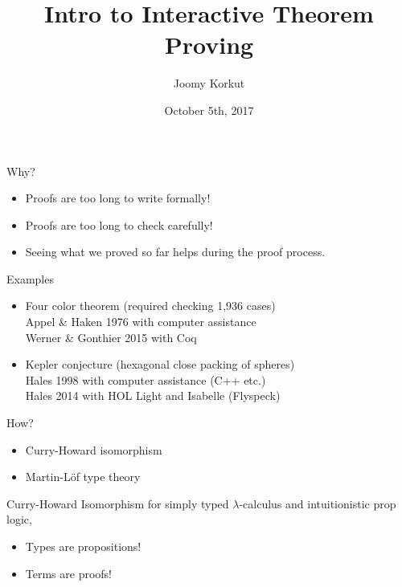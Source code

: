 \documentclass{beamer}
\title{Intro to Interactive Theorem Proving}
\author{Joomy Korkut}
\institute{Wesleyan University}
\date{October 5th, 2017}
\begin{document}
\begin{frame}
\titlepage
\end{frame}

\begin{frame}{Why?}
\begin{itemize}
\item<1-> Proofs are too long to write formally!
\item<2-> Proofs are too long to check carefully!
\item<3-> Seeing what we proved so far helps during the proof process.
\end{itemize}
\end{frame}

\begin{frame}{Examples}
\begin{itemize}
  \item<1-> Four color theorem (required checking 1,936 cases)
  \\ Appel \& Haken 1976 with computer assistance
  \\ Werner \& Gonthier 2015 with Coq
  \item<2-> Kepler conjecture (hexagonal close packing of spheres)
  \\ Hales 1998 with computer assistance (C++ etc.)
  \\ Hales 2014 with HOL Light and Isabelle (Flyspeck)
\end{itemize}
\end{frame}

\begin{frame}{How?}
\begin{itemize}
\item<1-> Curry-Howard isomorphism
\item<2-> Martin-L\"{o}f type theory
\end{itemize}
\end{frame}

\begin{frame}{Curry-Howard Isomorphism}
  for simply typed $\lambda$-calculus and intuitionistic prop logic,
  \begin{itemize}
    \item Types are propositions!
    \pause
    \item Terms are proofs!
  \end{itemize}

  \pause
  \begin{columns}
    \begin{column}{0.5\textwidth}
      \begin{prooftree}
      \end{prooftree}
    \end{column}
    \pause
    \begin{column}{0.5\textwidth}
      \begin{prooftree}
      \end{prooftree}
    \end{column}
  \end{columns}
\end{frame}
\end{document}
